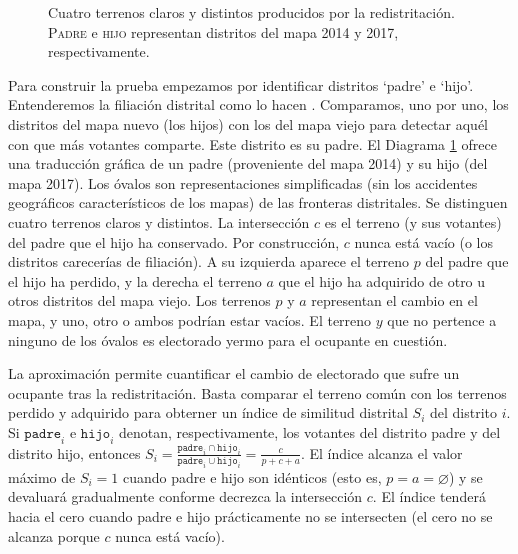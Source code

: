\documentclass[letter,12pt]{article}
\begin{document}
\begin{figure}
  \centering
    \usetikzlibrary{calc}
    \caption{Cuatro terrenos claros y distintos producidos por la redistritación. \textsc{Padre} e \textsc{hijo} representan distritos del mapa 2014 y 2017, respectivamente.}\label{F:venn}
\end{figure}

Para construir la prueba empezamos por identificar distritos `padre' e `hijo'. Entenderemos la filiación distrital como lo hacen \citet{cox.katz.2002}. Comparamos, uno por uno, los distritos del mapa nuevo (los hijos) con los del mapa viejo para detectar aquél con que más votantes comparte. Este distrito es su padre. El Diagrama \ref{F:venn} ofrece una traducción gráfica de un padre (proveniente del mapa 2014) y su hijo (del mapa 2017). Los óvalos son representaciones simplificadas (sin los accidentes geográficos característicos de los mapas) de las fronteras distritales. Se distinguen cuatro terrenos claros y distintos. La intersección $c$ es el terreno (y sus votantes) del padre que el hijo ha conservado. Por construcción, $c$ nunca está vacío (o los distritos carecerías de filiación). A su izquierda aparece el terreno $p$ del padre que el hijo ha perdido, y la derecha el terreno $a$ que el hijo ha adquirido de otro u otros distritos del mapa viejo. Los terrenos $p$ y $a$ representan el cambio en el mapa, y uno, otro o ambos podrían estar vacíos. El terreno $y$ que no pertence a ninguno de los óvalos es electorado yermo para el ocupante en cuestión.


La aproximación permite cuantificar el cambio de electorado que sufre un ocupante tras la redistritación. Basta comparar el terreno común con los terrenos perdido y adquirido para obterner un índice de similitud distrital $S_i$ del distrito $i$. Si $\texttt{padre}_i$ e $\texttt{hijo}_i$ denotan, respectivamente, los votantes del distrito padre y del distrito hijo, entonces $S_i = \frac{\texttt{padre}_i \cap \texttt{hijo}_i}{\texttt{padre}_i \cup \texttt{hijo}_i} = \frac{c}{p+c+a}$. El índice alcanza el valor máximo de $S_i=1$  cuando padre e hijo son idénticos (esto es, $p=a=\varnothing$) y se devaluará gradualmente conforme decrezca la intersección $c$. El índice tenderá hacia el cero cuando padre e hijo prácticamente no se intersecten (el cero no se alcanza porque $c$ nunca está vacío).
\end{document}
